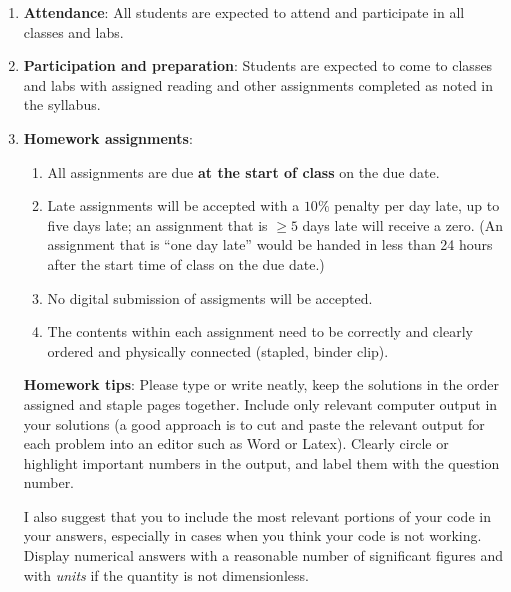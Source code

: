 \begin{enumerate}
\item {\bf Attendance}: All students are expected to attend and participate in all classes and labs.


\item {\bf Participation and preparation}: Students are expected to come to classes and labs with assigned reading and other assignments completed as noted in the syllabus.

\item {\bf Homework assignments}: 

\begin{enumerate}
\item All assignments are due {\bf at the start of class} on the due date. %
\item Late assignments will be accepted with a $10\%$ penalty per day late, up to five days late; an assignment that is $\ge 5$ days late will receive a zero. (An assignment that is ``one day late'' would be handed in less than 24 hours after the start time of class on the due date.)
\item No digital submission of assigments will be accepted. %
\item The contents within each assignment need to be correctly and clearly ordered and physically connected (\ie stapled, binder clip).
\end{enumerate}

{\bf Homework tips}: Please type or write neatly, keep the solutions in the order assigned and staple pages together. Include only relevant computer output in your solutions (a good approach is to cut and paste the relevant output for each problem into an editor such as Word or Latex). Clearly circle or highlight important numbers in the output, and label them with the question number.

I also suggest that you to include the most relevant portions of your code in your answers, especially in cases when you think your code is not working.  Display numerical answers with a reasonable number of significant figures and with {\em units} if the quantity is not dimensionless.


\end{enumerate}
